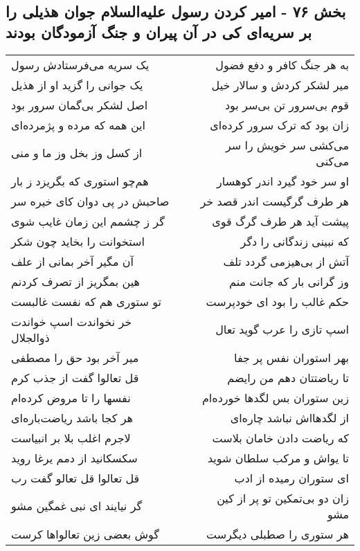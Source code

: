 \begin{center}
\section*{بخش ۷۶ - امیر کردن رسول علیه‌السلام جوان هذیلی را بر سریه‌ای کی در آن پیران  و جنگ آزمودگان بودند}
\label{sec:sh076}
\begin{longtable}{l p{0.5cm} r}
یک سریه می‌فرستادش رسول
&&
به هر جنگ کافر و دفع فضول
\\
یک جوانی را گزید او از هذیل
&&
میر لشکر کردش و سالار خیل
\\
اصل لشکر بی‌گمان سرور بود
&&
قوم بی‌سرور تن بی‌سر بود
\\
این همه که مرده و پژمرده‌ای
&&
زان بود که ترک سرور کرده‌ای
\\
از کسل وز بخل وز ما و منی
&&
می‌کشی سر خویش را سر می‌کنی
\\
هم‌چو استوری که بگریزد ز بار
&&
او سر خود گیرد اندر کوهسار
\\
صاحبش در پی دوان کای خیره سر
&&
هر طرف گرگیست اندر قصد خر
\\
گر ز چشمم این زمان غایب شوی
&&
پیشت آید هر طرف گرگ قوی
\\
استخوانت را بخاید چون شکر
&&
که نبینی زندگانی را دگر
\\
آن مگیر آخر بمانی از علف
&&
آتش از بی‌هیزمی گردد تلف
\\
هین بمگریز از تصرف کردنم
&&
وز گرانی بار که جانت منم
\\
تو ستوری هم که نفست غالبست
&&
حکم غالب را بود ای خودپرست
\\
خر نخواندت اسپ خواندت ذوالجلال
&&
اسپ تازی را عرب گوید تعال
\\
میر آخر بود حق را مصطفی
&&
بهر استوران نفس پر جفا
\\
قل تعالوا گفت از جذب کرم
&&
تا ریاضتتان دهم من رایضم
\\
نفسها را تا مروض کرده‌ام
&&
زین ستوران بس لگدها خورده‌ام
\\
هر کجا باشد ریاضت‌باره‌ای
&&
از لگدهااش نباشد چاره‌ای
\\
لاجرم اغلب بلا بر انبیاست
&&
که ریاضت دادن خامان بلاست
\\
سکسکانید از دمم یرغا روید
&&
تا یواش و مرکب سلطان شوید
\\
قل تعالوا قل تعالو گفت رب
&&
ای ستوران رمیده از ادب
\\
گر نیایند ای نبی غمگین مشو
&&
زان دو بی‌تمکین تو پر از کین مشو
\\
گوش بعضی زین تعالواها کرست
&&
هر ستوری را صطبلی دیگرست
\\

\end{longtable}
\end{center}
